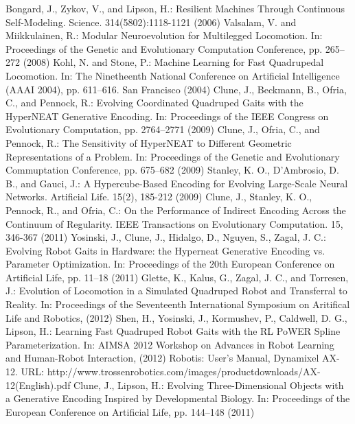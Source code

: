 Bongard, J., Zykov, V., and Lipson, H.:
Resilient Machines Through Continuous Self-Modeling.
Science. 314(5802):1118-1121 (2006)
%
Valsalam, V. and Miikkulainen, R.:
Modular Neuroevolution for Multilegged Locomotion.
In: Proceedings of the Genetic and Evolutionary Computation Conference, pp. 265--272 (2008)
%
Kohl, N. and Stone, P.:
Machine Learning for Fast Quadrupedal Locomotion.
In: The Ninetheenth National Conference on Artificial Intelligence (AAAI 2004), pp. 611--616. San Francisco (2004)
%
Clune, J., Beckmann, B., Ofria, C., and Pennock, R.:
Evolving Coordinated Quadruped Gaits with the HyperNEAT Generative Encoding.
In: Proceedings of the IEEE Congress on Evolutionary Computation, pp. 2764--2771 (2009)
%
Clune, J., Ofria, C., and Pennock, R.:
The Sensitivity of HyperNEAT to Different Geometric Representations of a Problem.
In: Proceedings of the Genetic and Evolutionary Commuptation Conference, pp. 675--682 (2009)
%
Stanley, K. O., D'Ambrosio, D. B., and Gauci, J.:
A Hypercube-Based Encoding for Evolving Large-Scale Neural Networks.
Artificial Life. 15(2), 185-212 (2009)
%
Clune, J., Stanley, K. O., Pennock, R., and Ofria, C.:
On the Performance of Indirect Encoding Across the Continuum of Regularity.
IEEE Transactions on Evolutionary Computation. 15, 346-367 (2011)
%
Yosinski, J., Clune, J., Hidalgo, D., Nguyen, S., Zagal, J. C.:
Evolving Robot Gaits in Hardware: the Hyperneat Generative Encoding vs. Parameter Optimization.
In: Proceedings of the 20th European Conference on Artificial Life, pp. 11--18 (2011)
%
Glette, K., Kalus, G., Zagal, J. C., and Torresen, J.:
Evolution of Locomotion in a Simulated Quadruped Robot and Transferral to Reality.
In: Proceedings of the Seventeenth International Symposium on Aritifical Life and Robotics, (2012)
%
Shen, H., Yosinski, J., Kormushev, P., Caldwell, D. G., Lipson, H.:
Learning Fast Quadruped Robot Gaits with the RL PoWER Spline Parameterization.
In: AIMSA 2012 Workshop on Advances in Robot Learning and Human-Robot Interaction, (2012)
%
Robotis:
User's Manual, Dynamixel AX-12.
URL: http://www.trossenrobotics.com/images/productdownloads/AX-12(English).pdf
%
Clune, J., Lipson, H.:
Evolving Three-Dimensional Objects with a Generative Encoding Inspired by Developmental Biology.
In: Proceedings of the European Conference on Artificial Life, pp. 144--148 (2011)
%

